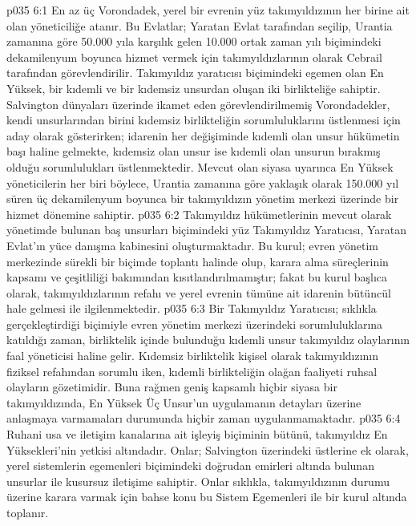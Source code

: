 \vs p035 6:1 En az üç Vorondadek, yerel bir evrenin yüz takımyıldızının her birine ait olan yöneticiliğe atanır. Bu Evlatlar; Yaratan Evlat tarafından seçilip, Urantia zamanına göre 50.000 yıla karşılık gelen 10.000 ortak zaman yılı biçimindeki dekamilenyum boyunca hizmet vermek için takımyıldızlarının  olarak Cebrail tarafından görevlendirilir. Takımyıldız yaratıcısı biçimindeki egemen olan En Yüksek, bir kıdemli ve bir kıdemsiz unsurdan oluşan iki birlikteliğe sahiptir. Salvington dünyaları üzerinde ikamet eden görevlendirilmemiş Vorondadekler, kendi unsurlarından birini kıdemsiz birlikteliğin sorumluluklarını üstlenmesi için aday olarak gösterirken; idarenin her değişiminde kıdemli olan unsur hükümetin başı haline gelmekte, kıdemsiz olan unsur ise kıdemli olan unsurun bırakmış olduğu sorumlulukları üstlenmektedir. Mevcut olan siyasa uyarınca En Yüksek yöneticilerin her biri böylece, Urantia zamanına göre yaklaşık olarak 150.000 yıl süren üç dekamilenyum boyunca bir takımyıldızın yönetim merkezi üzerinde bir hizmet dönemine sahiptir.
\vs p035 6:2 Takımyıldız hükümetlerinin mevcut olarak yönetimde bulunan baş unsurları biçimindeki yüz Takımyıldız Yaratıcısı, Yaratan Evlat’ın yüce danışma kabinesini oluşturmaktadır. Bu kurul; evren yönetim merkezinde sürekli bir biçimde toplantı halinde olup, karara alma süreçlerinin kapsamı ve çeşitliliği bakımından kısıtlandırılmamıştır; fakat bu kurul başlıca olarak, takımyıldızlarının refahı ve yerel evrenin tümüne ait idarenin bütüncül hale gelmesi ile ilgilenmektedir.
\vs p035 6:3 Bir Takımyıldız Yaratıcısı; sıklıkla gerçekleştirdiği biçimiyle evren yönetim merkezi üzerindeki sorumluluklarına katıldığı zaman, birliktelik içinde bulunduğu kıdemli unsur takımyıldız olaylarının faal yöneticisi haline gelir. Kıdemsiz birliktelik kişisel olarak takımyıldızının fiziksel refahından sorumlu iken, kıdemli birlikteliğin olağan faaliyeti ruhsal olayların gözetimidir. Buna rağmen geniş kapsamlı hiçbir siyasa bir takımyıldızında, En Yüksek Üç Unsur’un uygulamanın detayları üzerine anlaşmaya varmamaları durumunda hiçbir zaman uygulanmamaktadır.
\vs p035 6:4 Ruhani usa ve iletişim kanalarına ait işleyiş biçiminin bütünü, takımyıldız En Yüksekleri’nin yetkisi altındadır. Onlar; Salvington üzerindeki üstlerine ek olarak, yerel sistemlerin egemenleri biçimindeki doğrudan emirleri altında bulunan unsurlar ile kusursuz iletişime sahiptir. Onlar sıklıkla, takımyıldızının durumu üzerine karara varmak için bahse konu bu Sistem Egemenleri ile bir kurul altında toplanır.
